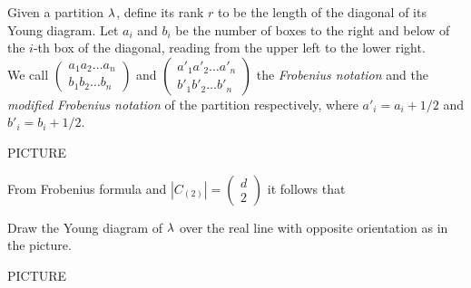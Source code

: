 \documentclass[10pt]{beamer}
\begin{document}
\begin{frame}



Given a partition $\lambda$, define its rank $r$ to be the length of the diagonal of its Young diagram. Let $a_i$ and $b_i$ be the number of boxes to the right and below of the $i$-th box of the diagonal, reading from the upper left to the lower right.\\
We call $\begin{pmatrix}a_1a_2\ldots a_n\\b_1b_2\ldots b_n\end{pmatrix}$ and $\begin{pmatrix}a'_1a'_2\ldots a'_n\\b'_1b'_2\ldots b'_n\end{pmatrix}$ the \emph{Frobenius notation} and the  \emph{modified Frobenius notation} of the partition respectively, where $a'_i=a_i+1/2$ and $b'_i=b_i+1/2$. 


PICTURE


\begin{lemma}
	\vspace{-6pt}
\end{lemma}

\end{frame}

\begin{frame}

From Frobenius formula and $|C_{(2)}|=\begin{pmatrix}d\\2\end{pmatrix}$ it follows that 

Draw the Young diagram of $\lambda$ over the real line with opposite orientation as in the picture. 

PICTURE

\end{frame}
\end{document}
